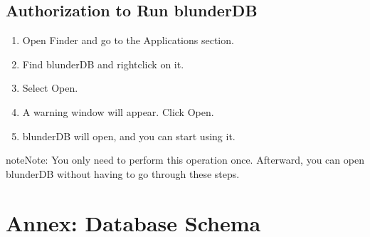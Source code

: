 \documentclass[letterpaper,10pt,english]{sphinxmanual}
\begin{document}
\subsection{Authorization to Run blunderDB}
\label{\detokenize{annexe_mac_securite:autorisation-de-l-execution-de-blunderdb}}\begin{enumerate}
%
\item {} 
\sphinxAtStartPar
Open Finder and go to the Applications section.

\item {} 
\sphinxAtStartPar
Find blunderDB and right\sphinxhyphen{}click on it.

\item {} 
\sphinxAtStartPar
Select Open.

\item {} 
\sphinxAtStartPar
A warning window will appear. Click Open.

\item {} 
\sphinxAtStartPar
blunderDB will open, and you can start using it.

\end{enumerate}

\begin{sphinxadmonition}{note}{Note:}
\sphinxAtStartPar
You only need to perform this operation once. Afterward, you can open blunderDB without having to go through these steps.
\end{sphinxadmonition}

\sphinxstepscope


\section{Annex: Database Schema}
\label{\detokenize{annexe_db_scheme:annexe-schema-de-la-base-de-donnees}}\label{\detokenize{annexe_db_scheme:annexe-db-migration}}\label{\detokenize{annexe_db_scheme::doc}}
\end{document}
